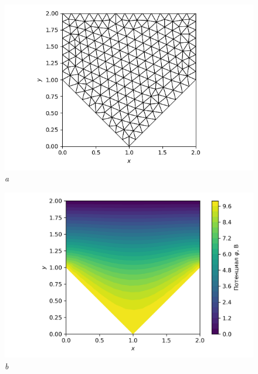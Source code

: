 \documentclass[12pt, a4paper]{article}
\begin{document}
			\begin{figure}[h]       
				\begin{center} 
					{ 
						\begin{minipage}{0.47\textwidth} 
							\centering 
							\hspace*{-21.5mm}
							\includegraphics[width=1.4\columnwidth]{Test_domain_4_mesh001_calfem_net_1.png}\\
							\hspace*{-12.5mm}
							\textit{a} 
						\end{minipage}                                 
					} 
					{ 
						\begin{minipage}{0.47\textwidth} 
							\centering 
							\hspace*{-17.5mm}
							\includegraphics[width=1.4\columnwidth]{Test_domain_4_mesh001_calfem.png}\\
							\hspace*{-1.5mm}
							\textit{b} 
						\end{minipage}                                 
					} 
					

\end{center}
\end{figure}
\end{document}
